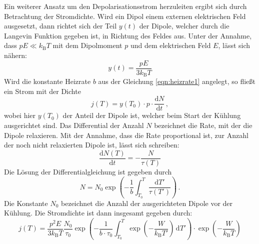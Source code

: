         \noindent Ein weiterer Ansatz um den Depolarisationsstrom herzuleiten ergibt sich durch Betrachtung der Stromdichte. Wird ein Dipol einem externen 
        elektrischen Feld ausgesetzt, dann richtet sich der Teil $y(t)$ der Dipole, welcher durch die Langevin Funktion gegeben ist, in Richtung des Feldes aus.
        Unter der Annahme, dass $pE \ll k_{\text{B}} T$ mit dem Dipolmoment $p$ und dem elektrischen Feld $E$, lässt sich nähern:
        \begin{equation}
            y(t) = \frac{pE}{3 k_\text{B} T}
        \end{equation}
        Wird die konstante Heizrate $b$ aus der Gleichung \eqref{eqn:heizrate1} angelegt, so fließt ein Strom mit der Dichte 
        \begin{equation}
            j(T) = y(T_0) \cdot p \cdot \frac{\text{d}N}{\text{d}t}\, ,
        \end{equation}
        wobei hier $y(T_0)$ der Anteil der Dipole ist, welcher beim Start der Kühlung ausgerichtet sind. Das Differential der Anzahl $N$ bezeichnet die Rate, mit 
        der die Dipole relaxieren. Mit der Annahme, dass die Rate proportional ist, zur Anzahl der noch nicht relaxierten Dipole ist, lässt sich schreiben:
        \begin{equation}
            \frac{\text{d}N(T) }{\text{d} t} = - \frac{N}{\tau(T)}
            \label{eqn:stromdansa1}
        \end{equation}
        Die Lösung der Differentialgleichung ist gegeben durch 
        \begin{equation}
            N = N_0 \exp\left(- \frac{1}{b} \int_{T_0}^{T} \frac{\text{d}T'}{\tau(T')}\right) \, .
        \end{equation}
        Die Konstante $N_0$ bezeichnet die Anzahl der ausgerichteten Dipole vor der Kühlung. Die Stromdichte ist dann insgesamt gegeben durch:
        \begin{equation}
            j(T) = \frac{p^2E}{3 k_\text{B} T} \frac{N_0}{\tau_0} \exp\left(- \frac{1}{b\cdot \tau_0} \int_{T_0}^{T} \exp\left(- \frac{W}{k_\text{B} T'}\right)\,\text{d}T'\right)\cdot  \exp\left(- \frac{W}{k_\text{B} T}\right)
            \label{eqn:Strom2}
        \end{equation}
